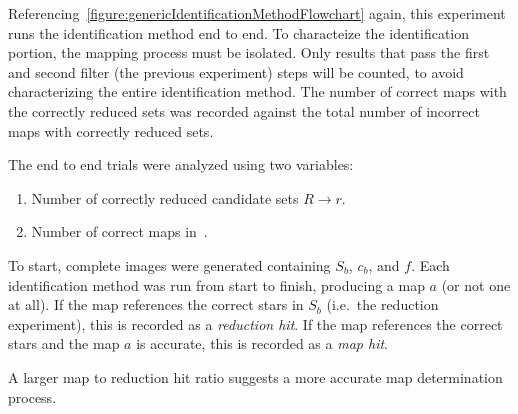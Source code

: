 Referencing~\autoref{figure:genericIdentificationMethodFlowchart} again, this experiment runs the identification
method end to end.
To characteize the identification portion, the mapping process must be isolated.
Only results that pass the first and second filter (the previous experiment) steps will be counted, to avoid
characterizing the entire identification method.
The number of correct maps with the correctly reduced sets was recorded against the total number of incorrect maps
with correctly reduced sets.

The end to end trials were analyzed using two variables:
\begin{enumerate}
    \item \label{itm:correctReducedCandidates} Number of correctly reduced candidate sets $R \rightarrow r$.
    \item Number of correct maps in~.
\end{enumerate}

To start, complete images were generated containing $S_b$, $c_b$, and $f$.
Each identification method was run from start to finish, producing a map $a$ (or not one at all).
If the map references the correct stars in $S_b$ (i.e.\ the reduction experiment), this is recorded as a
\textit{reduction hit}.
If the map references the correct stars and the map $a$ is accurate, this is recorded as a \textit{map hit}.

A larger map to reduction hit ratio suggests a more accurate map determination process.